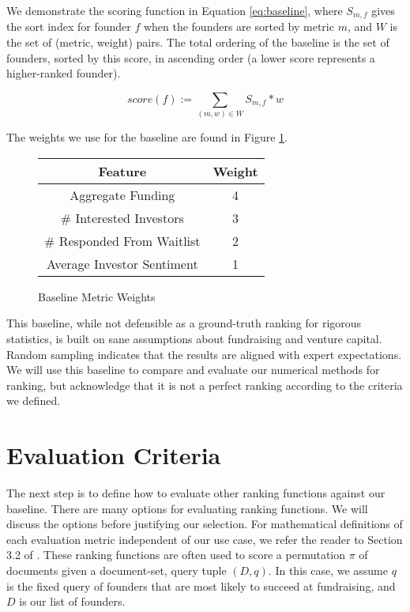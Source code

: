 We demonstrate the scoring function in Equation \ref{eq:baseline}, where $S_{m, f}$ gives the sort index for founder $f$ when the founders are sorted by metric $m$, and $W$ is the set of (metric, weight) pairs. The total ordering of the baseline is the set of founders, sorted by this score, in ascending order (a lower score represents a higher-ranked founder).

\begin{equation}
\label{eq:baseline}
  score(f) := \sum_{(m, w) \in W} S_{m, f} * w
\end{equation}

\noindent The weights we use for the baseline are found in Figure \ref{fig:nfr:baseline:weights}.

\begin{figure}[ht]
\begin{tabular}{c | c}
\textbf{Feature}           & \textbf{Weight} \\\hline
Aggregate Funding          & 4 \\\hline
\# Interested Investors    & 3 \\\hline
\# Responded From Waitlist & 2 \\\hline
Average Investor Sentiment & 1
\end{tabular}
\centering
\caption{Baseline Metric Weights}
\label{fig:nfr:baseline:weights}
\end{figure}

This baseline, while not defensible as a ground-truth ranking for rigorous statistics, is built on sane assumptions about fundraising and venture capital. Random sampling indicates that the results are aligned with expert expectations. We will use this baseline to compare and evaluate our numerical methods for ranking, but acknowledge that it is not a perfect ranking according to the criteria we defined.

\section{Evaluation Criteria}

The next step is to define how to evaluate other ranking functions against our baseline. There are many options for evaluating ranking functions. We will discuss the options before justifying our selection. For mathematical definitions of each evaluation metric independent of our use case, we refer the reader to Section 3.2 of \cite{DBLP:journals/corr/abs-0704-3359}. These ranking functions are often used to score a permutation $\pi$ of documents given a document-set, query tuple $(D, q)$. In this case, we assume $q$ is the fixed query of founders that are most likely to succeed at fundraising, and $D$ is our list of founders.

